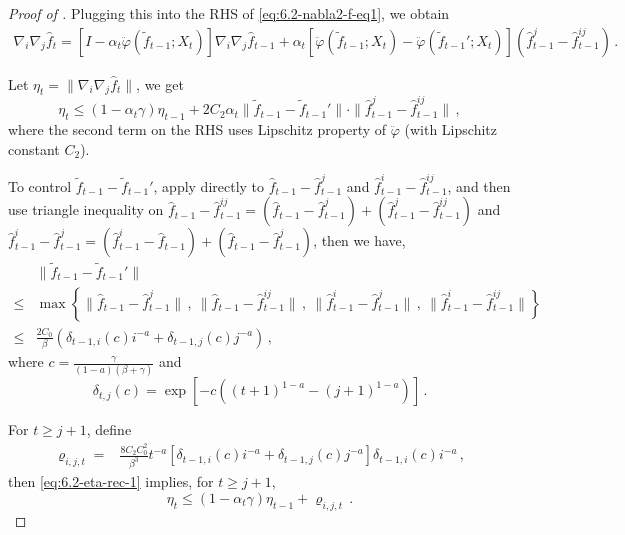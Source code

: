 \documentclass[11pt]{article}
\theoremstyle{plain}
\begin{document}
\begin{proof}[Proof of ]
Plugging this into the RHS of \eqref{eq:6.2-nabla2-f-eq1}, we obtain
\begin{align*}
  \nabla_i\nabla_j\hat f_t = \left[I-\alpha_t \ddot\varphi(\tilde  f_{t-1};X_t)\right] \nabla_i\nabla_j\hat f_{t-1}+\alpha_t\left[\ddot\varphi(\tilde f_{t-1};X_t)-\ddot\varphi(\tilde f_{t-1}';X_t)\right](\hat f_{t-1}^j-\hat f_{t-1}^{ij})\,.
\end{align*}


Let $\eta_t=\|\nabla_i\nabla_j\hat f_t\|$, we get
\begin{equation}
\eta_t\le (1-\alpha_t\gamma)\eta_{t-1}+2C_2 \alpha_t\|\tilde  f_{t-1}-\tilde f_{t-1}'\|\cdot\|\hat f_{t-1}^j-\hat f_{t-1}^{ij}\|\,,\label{eq:6.2-eta-rec-1}
\end{equation}
where the second term on the RHS uses Lipschitz property of $\ddot\varphi$ (with Lipschitz constant $C_2$).

To control $\tilde f_{t-1}-\tilde f_{t-1}'$, apply  directly to $\hat f_{t-1}-\hat f_{t-1}^j$ and $\hat f_{t-1}^i-\hat f_{t-1}^{ij}$, and then use triangle inequality on $\hat f_{t-1}-\hat f_{t-1}^{ij}=(\hat f_{t-1}-\hat f_{t-1}^j)+(\hat f_{t-1}^j-\hat f_{t-1}^{ij})$ and $\hat f^i_{t-1}-\hat f_{t-1}^{j} = (\hat f_{t-1}^i-\hat f_{t-1})+(\hat f_{t-1}-\hat f_{t-1}^j)$, then we have,
\begin{align*}
 & \|\tilde f_{t-1}-\tilde f_{t-1}'\|\\
 \le & \max\left\{\|\hat f_{t-1}-\hat f_{t-1}^j\|\,,~\|\hat f_{t-1}-\hat f_{t-1}^{ij}\|\,,~\|\hat f_{t-1}^i-\hat f_{t-1}^j\|\,,~\|\hat f_{t-1}^i-\hat f_{t-1}^{ij}\|\right\}\\
\le 
& \frac{2C_0}{\beta}\left(\delta_{t-1,i}(c)i^{-a}+\delta_{t-1,j}(c)j^{-a}\right)\,,
\end{align*}
where $c=\frac{\gamma}{(1-a)(\beta+\gamma)}$ and
$$
\delta_{t,j}(c) = \exp\left[-c((t+1)^{1-a}-(j+1)^{1-a})\right]\,.
$$


For $t\ge j+1$, define 
\begin{align*}
\varrho_{i,j,t}=&\frac{8C_2C_0^2}{\beta^3}t^{-a}\left[\delta_{t-1,i}(c)i^{-a}+\delta_{t-1,j}(c)j^{-a}\right]\delta_{t-1,i}(c)i^{-a}\,,
\end{align*}
then \eqref{eq:6.2-eta-rec-1} implies, for $t\ge j+1$,
\begin{equation}\label{eq:6.2-eta-rec-2}
\eta_{t}\le (1-\alpha_{t}\gamma)\eta_{t-1}+\varrho_{i,j,t}\,.
\end{equation}



\end{proof}
\end{document}
